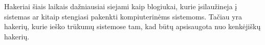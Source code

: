 Hakeriai šiais laikais dažniausiai siejami kaip blogiukai, kurie įsilaužineja į sistemas ar kitaip stengiasi pakenkti kompiuterinėms sistemoms. Tačiau yra hakerių, kurie ieško trūkumų sistemose tam, kad būtų apsisaugota nuo kenkėjiškų hakerių.